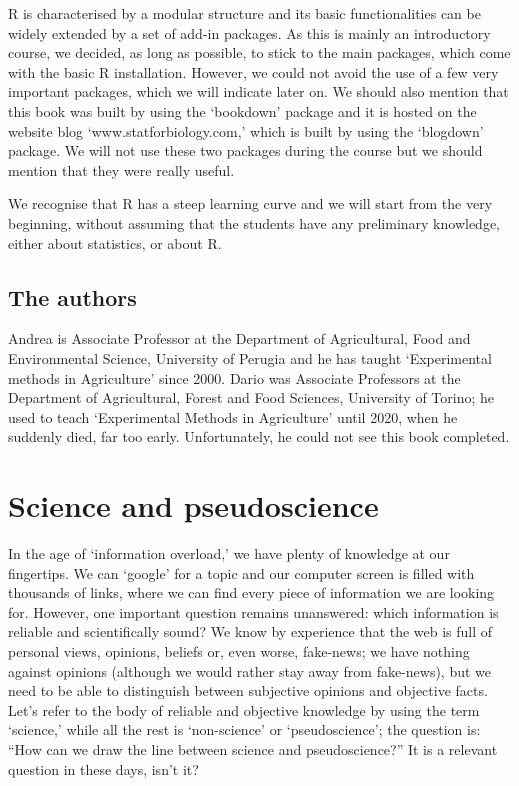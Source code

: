 \documentclass[a4paper,12pt,oneside]{book}
\begin{document}
R is characterised by a modular structure and its basic functionalities can be widely extended by a set of add-in packages. As this is mainly an introductory course, we decided, as long as possible, to stick to the main packages, which come with the basic R installation. However, we could not avoid the use of a few very important packages, which we will indicate later on. We should also mention that this book was built by using the `bookdown' package and it is hosted on the website blog `www.statforbiology.com,' which is built by using the `blogdown' package. We will not use these two packages during the course but we should mention that they were really useful.

We recognise that R has a steep learning curve and we will start from the very beginning, without assuming that the students have any preliminary knowledge, either about statistics, or about R.

\hypertarget{the-authors}{%
\section*{The authors}\label{the-authors}}

Andrea is Associate Professor at the Department of Agricultural, Food and Environmental Science, University of Perugia and he has taught `Experimental methods in Agriculture' since 2000. Dario was Associate Professors at the Department of Agricultural, Forest and Food Sciences, University of Torino; he used to teach `Experimental Methods in Agriculture' until 2020, when he suddenly died, far too early. Unfortunately, he could not see this book completed.

\hypertarget{science-and-pseudoscience}{%
\chapter{Science and pseudoscience}\label{science-and-pseudoscience}}

In the age of `information overload,' we have plenty of knowledge at our fingertips. We can `google' for a topic and our computer screen is filled with thousands of links, where we can find every piece of information we are looking for. However, one important question remains unanswered: which information is reliable and scientifically sound? We know by experience that the web is full of personal views, opinions, beliefs or, even worse, fake-news; we have nothing against opinions (although we would rather stay away from fake-news), but we need to be able to distinguish between subjective opinions and objective facts. Let's refer to the body of reliable and objective knowledge by using the term `science,' while all the rest is `non-science' or `pseudoscience'; the question is: ``How can we draw the line between science and pseudoscience?'' It is a relevant question in these days, isn't it?
\end{document}
